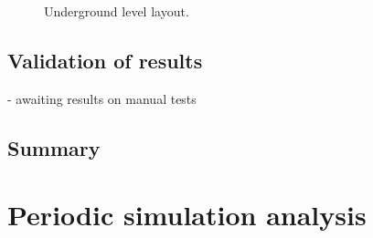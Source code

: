 	\begin{figure}[h!]
		\centering
		\caption{Underground level layout.}
		\label{fig: KUS Simulation level layout}
	\end{figure}	
	
	
	\subsection{Validation of results}
	
	- awaiting results on manual tests
	
	\subsection{Summary}
\newpage
\section{Periodic simulation analysis}
